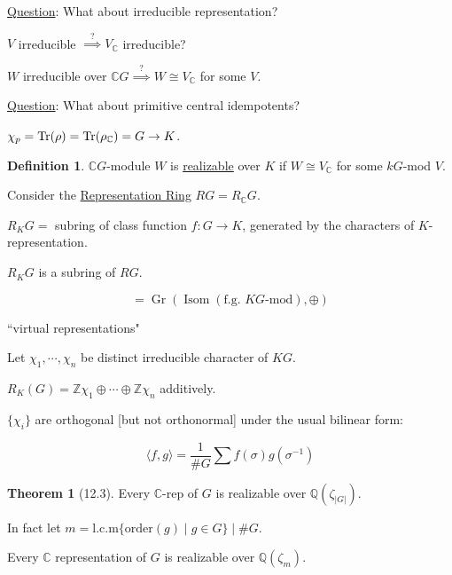 \documentclass{article}
\theoremstyle{definition}
\newtheorem*{definition}{Definition}
\newtheorem{theorem}{Theorem}
\begin{document}
\underline{Question}: What about irreducible representation?

\(V\) irreducible \(\overset{?}{\implies} V_\mathbb{C}\) irreducible?

\(W\) irreducible over \(\mathbb{C} G \overset{?}{\implies} W \cong V_\mathbb{C}\) for some \(V\).

\underline{Question}: What about primitive central idempotents?

\begin{center}
\end{center}

\(\chi_p = \Tr(\rho) = \Tr(\rho_\mathbb{C}) = G \to K\).

\begin{definition}
    \(\mathbb{C} G\)-module \(W\) is \underline{realizable} over \(K\) if \(W \cong V_\mathbb{C}\) for some \(kG\)-mod \(V\).
\end{definition}

Consider the \underline{Representation Ring} \(RG = R_\mathbb{C} G\).

\(R_K G =\) subring of class function \(f: G \to K\), generated by the characters of \(K\)-representation.

\(R_K G\) is a subring of \(RG\).

\[
    = \operatorname{Gr}(\operatorname{Isom}(\text{f.g. }KG \text{-mod}), \oplus)
\]

``virtual representations"

Let \(\chi_1, \cdots , \chi_n\) be distinct irreducible character of \(KG\).

\(R_K(G) = \mathbb{Z} \chi_1 \oplus \cdots \oplus \mathbb{Z} \chi_n\) additively.

\(\{ \chi_i \} \) are orthogonal [but not orthonormal] under the usual bilinear form:

\[
    \langle f,g \rangle = \frac{1}{\# G} \sum f(\sigma)g(\sigma^{-1})
\]

\begin{theorem}
    [12.3] Every \(\mathbb{C}\)-rep of \(G\) is realizable over \(\mathbb{Q}(\zeta_{\vert G \vert})\).

    In fact let \(m = \text{l.c.m}\{ \text{order}(g) \mid g \in G \} \mid \#G\).

    Every \(\mathbb{C}\) representation of \(G\) is realizable over \(\mathbb{Q}(\zeta_m)\).
\end{theorem}
\end{document}
